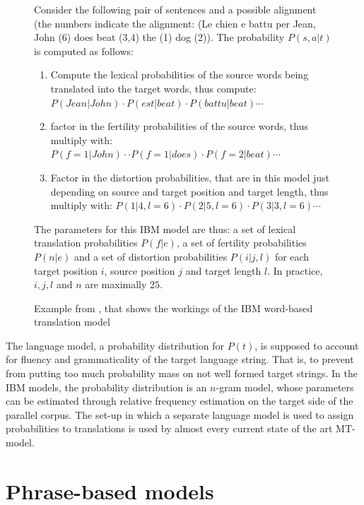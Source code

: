 \documentclass{report}
\theoremstyle{definition}
\theoremstyle{plain}
\begin{document}
\begin{figure}[!ht]
\begin{framed}
\scriptsize{
Consider the following pair of sentences and a possible alignment (the numbers indicate the alignment: (Le chien e battu per Jean, John (6) does beat (3,4) the (1) dog (2)). The probability $P(s,a|t)$ is computed as follows:\begin{enumerate}
\item Compute the lexical probabilities of the source words being translated into the target words, thus compute: $P(Jean|John)\cdot P(est|beat)\cdot P(battu|beat)\cdots$
\item factor in the fertility probabilities of the source words, thus multiply with:  $P(f\!=\!1|John)\cdot \cdot P(f\!=\!1|does) \cdot P(f\!=\!2|beat)\cdots $
\item Factor in the distortion probabilities, that are in this model just depending on source and target position and target length, thus multiply with: $P(1|4,l\!=\!6)\cdot P(2|5,l\!=\!6)\cdot P(3|3,l\!=\!6) \cdots $
\end{enumerate}
The parameters for this IBM model are thus: a set of lexical translation probabilities $P(f|e)$, a set of fertility probabilities $P(n|e)$ and a set of distortion probabilities $P(i|j,l)$ for each target position $i$, source position $j$ and target length $l$. In practice, $i,j,l$ and $n$ are maximally $25$.
}
\end{framed}
\caption{Example from \cite[p.3]{brown1990statistical}, that shows the workings of the IBM word-based translation model}\label{fig:IBM-model}
\end{figure}

The language model, a probability distribution for $P(t)$, is supposed to account for fluency and grammaticality of the target language string. That is, to prevent from putting too much probability mass on not well formed target strings. In the IBM models, the probability distribution is an $n$-gram model, whose parameters can be estimated through relative frequency estimation on the target side of the parallel corpus. The set-up in which a separate language model is used to assign probabilities to translations is used by almost every current state of the art MT-model.


\section{Phrase-based models}
\label{sec:pbmodels}
\end{document}
